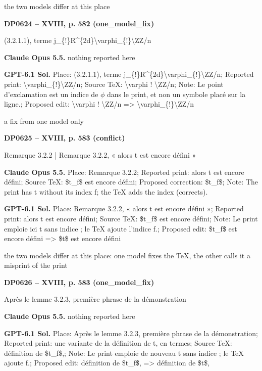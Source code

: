 the two models differ at this place\par
\par\noindent\hypertarget{DP0624}{}\textbf{DP0624 -- XVIII, p. 582 (one\_model\_fix)}\par
(3.2.1.1), terme j\_\{!\}R\textasciicircum{}\{2d\}\textbackslash{}varphi\_\{!\}\textbackslash{}ZZ/n\par
\textbf{Claude Opus 5.5.} nothing reported here\par
\textbf{GPT-6.1 Sol.} Place: (3.2.1.1), terme j\_\{!\}R\textasciicircum{}\{2d\}\textbackslash{}varphi\_\{!\}\textbackslash{}ZZ/n; Reported print: \textbackslash{}varphi\_\{!\}\textbackslash{}ZZ/n; Source TeX: \textbackslash{}varphi ! \textbackslash{}ZZ/n; Note: Le point d'exclamation est un indice de \ensuremath{\phi} dans le print, et non un symbole placé sur la ligne.; Proposed edit: \textbackslash{}varphi ! \textbackslash{}ZZ/n =\allowbreak > \textbackslash{}varphi\_\{!\}\textbackslash{}ZZ/n\par
a fix from one model only\par
\par\noindent\hypertarget{DP0625}{}\textbf{DP0625 -- XVIII, p. 583 (conflict)}\par
Remarque 3.2.2 | Remarque 3.2.2, « alors t est encore défini »\par
\textbf{Claude Opus 5.5.} Place: Remarque 3.2.2; Reported print: alors t est encore défini; Source TeX: \$t\_f\$ est encore défini; Proposed correction: \$t\_f\$; Note: The print has t without its index f; the TeX adds the index (corrects).\par
\textbf{GPT-6.1 Sol.} Place: Remarque 3.2.2, « alors t est encore défini »; Reported print: alors t est encore défini; Source TeX: \$t\_f\$ est encore défini; Note: Le print emploie ici t sans indice ; le TeX ajoute l'indice f.; Proposed edit: \$t\_f\$ est encore défini =\allowbreak > \$t\$ est encore défini\par
the two models differ at this place: one model fixes the TeX, the other calls it a misprint of the print\par
\par\noindent\hypertarget{DP0626}{}\textbf{DP0626 -- XVIII, p. 583 (one\_model\_fix)}\par
Après le lemme 3.2.3, première phrase de la démonstration\par
\textbf{Claude Opus 5.5.} nothing reported here\par
\textbf{GPT-6.1 Sol.} Place: Après le lemme 3.2.3, première phrase de la démonstration; Reported print: une variante de la définition de t, en termes; Source TeX: définition de \$t\_f\$,; Note: Le print emploie de nouveau t sans indice ; le TeX ajoute f.; Proposed edit: définition de \$t\_f\$, =\allowbreak > définition de \$t\$,\par
